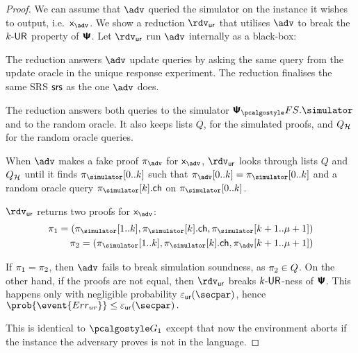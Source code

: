 \begin{proof}
	We can assume that $\adv$ queried the simulator on the instance it wishes to
	output, i.e.~$\inp_{\adv}$. We show a reduction $\rdvur$ that utilises $\adv$
	to break the ${k\text{-}\mathsf{UR}}$ property of $\bm{\mathsf{\Psi}}$. Let $\rdvur$ run $\advse$ internally
	as a black-box:
	\begin{compactitem}
		\item The reduction answers $\adv$ update queries by asking the same query from the update oracle in the unique response experiment. The reduction finalises the same SRS $\mathsf{srs}$ as the one $\adv$ does.
		\item The reduction answers both queries to the simulator $\psfs.\simulator$
		and to the random oracle.  It also keeps lists $Q$, for the simulated
		proofs, and $Q_{\mathcal{H}}$ for the random oracle queries.
		\item When $\adv$ makes a fake proof $\zkproof_{\adv}$ for $\inp_{\adv}$,
		$\rdvur$ looks through lists $Q$ and $Q_{\mathcal{H}}$ until it finds
		$\zkproof_{\simulator}[0..k]$ such that
		$\zkproof_{\adv}[0..k] = \zkproof_{\simulator}[0..k]$ and a random oracle
		query $\zkproof_{\simulator}[k].\ch$ on $\zkproof_{\simulator}[0..k]$.
		\item $\rdvur$ returns two proofs for $\inp_{\adv}$:
		\begin{align*}
		\zkproof_1 = (\zkproof_{\simulator}[1..k],
		\zkproof_{\simulator}[k].\ch, \zkproof_{\simulator}[k + 1..\mu + 1])\\
		\zkproof_2 = (\zkproof_{\simulator}[1..k],
		\zkproof_{\simulator}[k].\ch, \zkproof_{\adv}[k + 1..\mu + 1])
		\end{align*}
	\end{compactitem}  
	If $\pi_1 = \pi_2$, then $\adv$ fails to break simulation soundness,
	as $\pi_2 \in Q$. On the other hand, if the proofs are not equal, then
	$\rdvur$ breaks ${k\text{-}\mathsf{UR}}$-ness of $\bm{\mathsf{\Psi}}$. This happens only with negligible
	probability $\epsur(\secpar)$, hence
	\( \prob{\event{\errur}} \leq \epsur(\secpar)\,. \)
	
	 This is identical to $\game{1}$ except that now the environment
	aborts if the instance the adversary proves is not in the language.
	

\end{proof}
